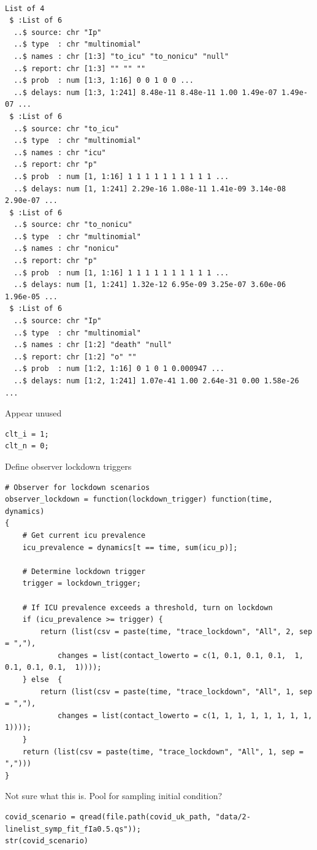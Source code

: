 \documentclass[11pt]{article}
\begin{document}
\begin{verbatim}

List of 4
 $ :List of 6
  ..$ source: chr "Ip"
  ..$ type  : chr "multinomial"
  ..$ names : chr [1:3] "to_icu" "to_nonicu" "null"
  ..$ report: chr [1:3] "" "" ""
  ..$ prob  : num [1:3, 1:16] 0 0 1 0 0 ...
  ..$ delays: num [1:3, 1:241] 8.48e-11 8.48e-11 1.00 1.49e-07 1.49e-07 ...
 $ :List of 6
  ..$ source: chr "to_icu"
  ..$ type  : chr "multinomial"
  ..$ names : chr "icu"
  ..$ report: chr "p"
  ..$ prob  : num [1, 1:16] 1 1 1 1 1 1 1 1 1 1 ...
  ..$ delays: num [1, 1:241] 2.29e-16 1.08e-11 1.41e-09 3.14e-08 2.90e-07 ...
 $ :List of 6
  ..$ source: chr "to_nonicu"
  ..$ type  : chr "multinomial"
  ..$ names : chr "nonicu"
  ..$ report: chr "p"
  ..$ prob  : num [1, 1:16] 1 1 1 1 1 1 1 1 1 1 ...
  ..$ delays: num [1, 1:241] 1.32e-12 6.95e-09 3.25e-07 3.60e-06 1.96e-05 ...
 $ :List of 6
  ..$ source: chr "Ip"
  ..$ type  : chr "multinomial"
  ..$ names : chr [1:2] "death" "null"
  ..$ report: chr [1:2] "o" ""
  ..$ prob  : num [1:2, 1:16] 0 1 0 1 0.000947 ...
  ..$ delays: num [1:2, 1:241] 1.07e-41 1.00 2.64e-31 0.00 1.58e-26 ...
\end{verbatim}

Appear unused
\begin{verbatim}
clt_i = 1;
clt_n = 0;
\end{verbatim}

Define observer lockdown triggers
\begin{verbatim}
# Observer for lockdown scenarios
observer_lockdown = function(lockdown_trigger) function(time, dynamics)
{
    # Get current icu prevalence
    icu_prevalence = dynamics[t == time, sum(icu_p)];

    # Determine lockdown trigger
    trigger = lockdown_trigger;

    # If ICU prevalence exceeds a threshold, turn on lockdown
    if (icu_prevalence >= trigger) {
        return (list(csv = paste(time, "trace_lockdown", "All", 2, sep = ","),
            changes = list(contact_lowerto = c(1, 0.1, 0.1, 0.1,  1, 0.1, 0.1, 0.1,  1))));
    } else  {
        return (list(csv = paste(time, "trace_lockdown", "All", 1, sep = ","),
            changes = list(contact_lowerto = c(1, 1, 1, 1, 1, 1, 1, 1, 1))));
    }
    return (list(csv = paste(time, "trace_lockdown", "All", 1, sep = ",")))
}
\end{verbatim}

Not sure what this is. Pool for sampling initial condition?
\begin{verbatim}
covid_scenario = qread(file.path(covid_uk_path, "data/2-linelist_symp_fit_fIa0.5.qs"));
str(covid_scenario)
\end{verbatim}
\end{document}
